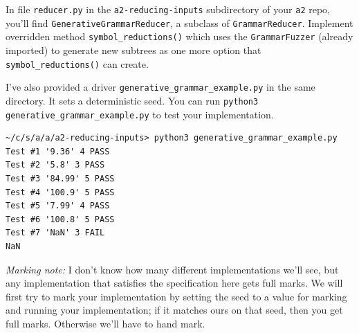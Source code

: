 \begin{enumerate}[label=(\alph*)]
In file \texttt{reducer.py} in the \texttt{a2-reducing-inputs} subdirectory of your \texttt{a2} repo, you'll find \texttt{GenerativeGrammarReducer}, a subclass of \texttt{GrammarReducer}. Implement overridden method \texttt{symbol\_reductions()} which uses the \texttt{GrammarFuzzer} (already imported) to generate new subtrees as one more option that \texttt{symbol\_reductions()} can create.

I've also provided a driver \texttt{generative\_grammar\_example.py} in the same directory. It sets a deterministic seed. You can run \texttt{python3 generative\_grammar\_example.py} to test your implementation.
\begin{verbatim}
~/c/s/a/a/a2-reducing-inputs> python3 generative_grammar_example.py
Test #1 '9.36' 4 PASS
Test #2 '5.8' 3 PASS
Test #3 '84.99' 5 PASS
Test #4 '100.9' 5 PASS
Test #5 '7.99' 4 PASS
Test #6 '100.8' 5 PASS
Test #7 'NaN' 3 FAIL
NaN
\end{verbatim}

\emph{Marking note:} I don't know how many different implementations we'll see, but any implementation that satisfies the specification here gets full marks. We will first try to mark your implementation by setting the seed to a value for marking and running your implementation; if it matches ours on that seed, then you get full marks. Otherwise we'll have to hand mark.
\end{enumerate}
